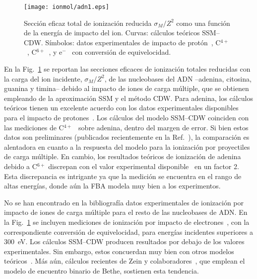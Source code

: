 \begin{figure}
\centering
\texttt{[image: ionmol/adn1.eps]}
\caption[Sección eficaz total de ionización reducida por $Z$ (Parte I).]
{Sección eficaz total de ionización reducida $\sigma_{M}/Z^2$ como 
una función de la energía de impacto del ion. Curvas: cálculos teóricos 
SSM--CDW. Símbolos: datos experimentales de impacto de 
protón~\cite{Iriki:11}, 
C$^{4+}$~\cite{Sens:20}, C$^{6+}$~\cite{Bhattacharjee:19}, y 
e$^-$~\cite{Rahman:16} con conversión de equivelocidad.}
\label{fig:crossDNA_1}
\end{figure} 

En la Fig.~\ref{fig:crossDNA_1} se reportan las secciones eficaces de 
ionización totales reducidas con la carga del ion incidente, 
$\sigma_M/Z^2$, de las nucleobases del ADN --adenina, citosina, guanina 
y timina-- debido al impacto de iones de carga múltiple, que se obtienen 
empleando de la aproximación SSM y el método CDW. Para adenina, los 
cálculos teóricos tienen un excelente acuerdo con los datos 
experimentales disponibles para el impacto de protones~\cite{Iriki:11}. 
Los cálculos del modelo SSM--CDW coinciden con las mediciones de 
C$^{4+}$~\cite{Sens:20} sobre adenina, dentro del margen de error. Si 
bien estos datos son preliminares (publicados recientemente en la 
Ref.~\cite{Sens:20}), la 
comparación es alentadora en cuanto a la respuesta del modelo para la 
ionización por proyectiles de carga múltiple. En cambio, los resultados 
teóricos de ionización de adenina debido a C$^{6+}$ discrepan con el 
valor experimental disponible~\cite{Bhattacharjee:19} en un factor 2. 
Esta discrepancia es intrigante ya que la medición se encuentra en el 
rango de altas energías, donde aún la FBA modela muy bien a los 
experimentos.

No se han encontrado en la bibliografía datos experimentales de 
ionización por impacto de iones de carga múltiple para el resto de las 
nucleobases de ADN. En la Fig.~\ref{fig:crossDNA_1} se incluyen 
mediciones de ionización por impacto de electrones~\cite{Rahman:16}, con 
la correspondiente conversión de equivelocidad, para energías incidentes 
superiores a 300~eV. Los cálculos SSM--CDW producen resultados por 
debajo de los valores experimentales. Sin embargo, estos concuerdan muy
bien con otros modelos teóricos~\cite{mozejko2003,tan2018}. Más aún, 
cálculos recientes de Zein y colaboradores~\cite{Zein:21}, que emplean 
el modelo de encuentro binario de Bethe, sostienen esta tendencia.

